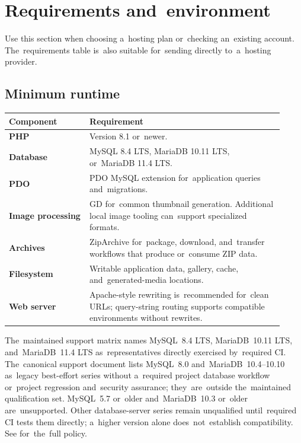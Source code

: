 \documentclass[11pt,a4paper]{article}
\newcommand{\filepath}[1]{\path{#1}}
\begin{document}
\section{Requirements and~environment}
\label{sec:requirements}

Use this section when choosing a~hosting plan or~checking an~existing account.
The~requirements table is~also suitable for~sending directly to~a~hosting
provider.

\subsection{Minimum runtime}

\begin{longtable}{>{\bfseries}p{0.27\linewidth}p{0.65\linewidth}}
\toprule
Component & Requirement\\
\midrule
\endhead
PHP & Version 8.1 or~newer.\\
Database & MySQL 8.4 LTS, MariaDB 10.11 LTS, or~MariaDB 11.4 LTS.\\
PDO & PDO MySQL extension for~application queries and~migrations.\\
Image processing & GD for~common thumbnail generation. Additional local image
tooling can~support specialized formats.\\
Archives & ZipArchive for~package, download, and~transfer workflows that produce
or~consume ZIP data.\\
Filesystem & Writable application data, gallery, cache, and~generated-media
locations.\\
Web server & Apache-style rewriting is~recommended for~clean URLs; query-string
routing supports compatible environments without rewrites.\\
\bottomrule
\end{longtable}

The~maintained support matrix names MySQL~8.4 LTS, MariaDB~10.11 LTS,
and~MariaDB~11.4 LTS as~representatives directly exercised by~required CI.
The~canonical support document lists MySQL~8.0 and~MariaDB~10.4--10.10 as~legacy
best-effort series without a~required project database workflow or~project
regression and~security assurance; they~are~outside the~maintained qualification
set. MySQL~5.7 or~older and~MariaDB~10.3 or~older are~unsupported. Other
database-server series remain unqualified until~required CI tests them directly;
a~higher version alone does~not~establish compatibility. See
\filepath{docs/DATABASE_SUPPORT.md} for~the~full policy.
\end{document}

